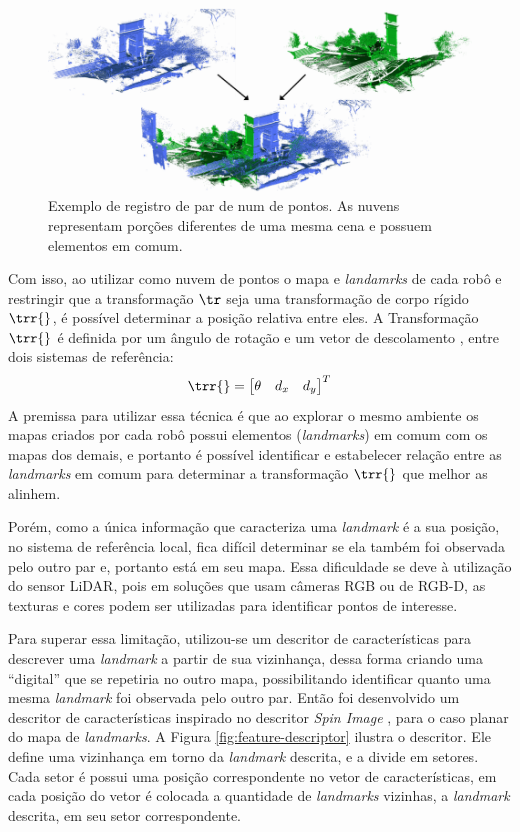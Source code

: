 \begin{figure}[h]
  \centering
  \includegraphics[width=.7\textwidth]{figs/point-cloud-registration-example.png}
  \caption{Exemplo de registro de par de num de pontos. As nuvens representam porções diferentes de uma mesma cena e possuem elementos 
  em comum.}
  \label{fig:point-cloud-registration-example}
\end{figure}

Com isso, ao utilizar como nuvem de pontos o mapa 
e \textit{landamrks} de cada robô e restringir que a transformação $\tr$ seja uma transformação de corpo rígido $\trr{}$, é possível determinar 
a posição 
relativa entre eles. A Transformação $\trr{}$ é definida por um ângulo
de rotação e um vetor de descolamento , entre dois sistemas de referência:
\begin{equation}
  \trr{} = \begin{bmatrix}
    \theta & d_x & d_y 
  \end{bmatrix}^T
  \label{eq:rigid-transform}
\end{equation}
A premissa para utilizar essa técnica é que ao 
explorar o mesmo ambiente os mapas criados por cada robô possui 
elementos (\textit{landmarks}) em comum com 
os mapas dos demais, e portanto é possível identificar e estabelecer 
relação entre as \textit{landmarks} em comum para determinar a 
transformação $\trr{}$ que melhor as alinhem.

Porém, como a única informação que caracteriza uma \textit{landmark} é a 
sua posição, no sistema de referência local, fica difícil determinar se 
ela também foi observada pelo outro par e, portanto está em seu mapa. Essa 
dificuldade se deve à utilização do sensor LiDAR, pois em soluções que usam 
câmeras RGB ou de RGB-D, as texturas e cores podem ser utilizadas para 
identificar pontos de interesse.

Para superar essa limitação, utilizou-se um descritor de características 
para descrever uma \textit{landmark} a partir de sua vizinhança, dessa 
forma criando uma ``digital'' que se repetiria no outro mapa, 
possibilitando identificar quanto uma mesma \textit{landmark} foi observada 
pelo outro par. Então foi desenvolvido um descritor de características 
inspirado no descritor \textit{Spin Image} \cite{johnson1999using}, 
para o caso planar do mapa de \textit{landmarks}. A Figura \ref{fig:feature-descriptor} ilustra o descritor. Ele define uma 
vizinhança em torno da \textit{landmark} descrita, e a divide em setores. 
Cada setor é possui uma posição correspondente no vetor de características, 
em cada posição do vetor é colocada a quantidade de \textit{landmarks} 
vizinhas, a \textit{landmark} descrita, em seu setor correspondente.

